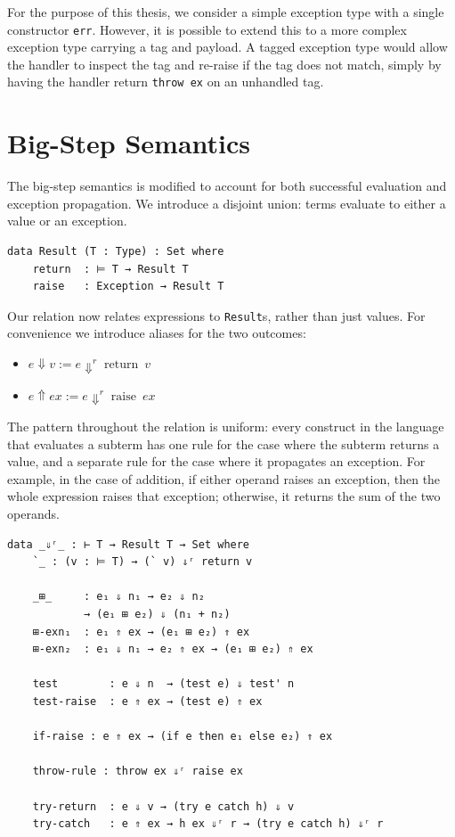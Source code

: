 For the purpose of this thesis, we consider a simple exception type with a single constructor \texttt{err}. However, it is possible to extend this to a more complex exception type carrying a tag and payload. 
A tagged exception type would allow the handler to inspect the tag and re-raise if the tag does not match, simply by having the handler return \texttt{throw ex} on an unhandled tag.


\section{Big-Step Semantics}

The big-step semantics is modified to account for both successful evaluation and exception propagation. 
We introduce a disjoint union: terms evaluate to either a value or an exception.
\begin{verbatim}
data Result (T : Type) : Set where
    return  : ⊨ T → Result T
    raise   : Exception → Result T

\end{verbatim}

Our relation now relates expressions to \texttt{Result}s, rather than just values.
For convenience we introduce aliases for the two outcomes:
\begin{itemize}
    \item $e \Downarrow v := e \Downarrow^r \operatorname{return}\ v$
    \item $e \Uparrow ex := e \Downarrow^r \operatorname{raise}\ ex$
\end{itemize}

The pattern throughout the relation is uniform: every construct in the language that evaluates a subterm has one rule for the case where the subterm returns a value, and a separate rule for the case where it propagates an exception.
For example, in the case of addition, if either operand raises an exception, then the whole expression raises that exception; otherwise, it returns the sum of the two operands.

\begin{verbatim}
data _⇓ʳ_ : ⊢ T → Result T → Set where
    `_ : (v : ⊨ T) → (` v) ⇓ʳ return v
    
    _⊞_     : e₁ ⇓ n₁ → e₂ ⇓ n₂
            → (e₁ ⊞ e₂) ⇓ (n₁ + n₂)
    ⊞-exn₁  : e₁ ⇑ ex → (e₁ ⊞ e₂) ⇑ ex
    ⊞-exn₂  : e₁ ⇓ n₁ → e₂ ⇑ ex → (e₁ ⊞ e₂) ⇑ ex

    test        : e ⇓ n  → (test e) ⇓ test' n
    test-raise  : e ⇑ ex → (test e) ⇑ ex

    if-raise : e ⇑ ex → (if e then e₁ else e₂) ⇑ ex
  
    throw-rule : throw ex ⇓ʳ raise ex

    try-return  : e ⇓ v → (try e catch h) ⇓ v
    try-catch   : e ⇑ ex → h ex ⇓ʳ r → (try e catch h) ⇓ʳ r
\end{verbatim}


